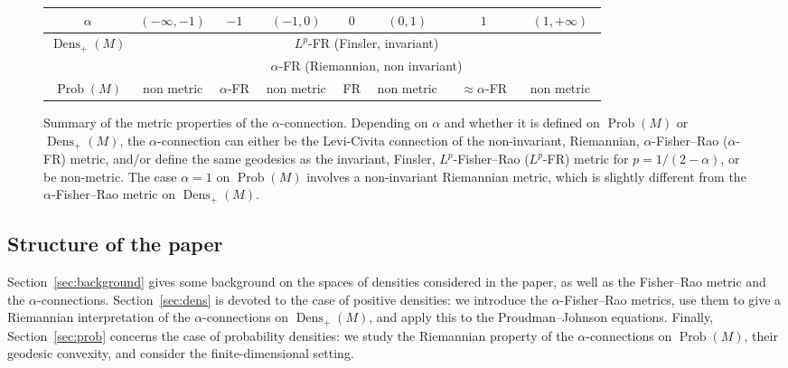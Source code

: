 \documentclass[11pt,reqno]{amsart}
\theoremstyle{definition}
\newcommand{\Prob}{\operatorname{Prob}(M)}
\newcommand{\Dens}{\operatorname{Dens}_+(M)}
\begin{document}
\begin{figure}\label{fig:summary}
\bgroup
\def\arraystretch{1.25}
\begin{tabular}{|c|c|c|c|c|c|c|c|}
  \hline
  $\alpha$                  & $(-\infty,-1)$ & $-1$ & $(-1,0)$ & $0$ & $(0,1)$ & $1$           & $(1,+\infty)$\\
  \hline
  \multirow{2}{*}{$\Dens$} & \cellcolor{gray!50} & \multicolumn{5}{c|}{$L^p$-FR (Finsler, invariant)} & \cellcolor{gray!50}\\
  \cline{2-8}
                           & \multicolumn{7}{c|}{$\alpha$-FR (Riemannian, non invariant)} \\
  \hline
  $\Prob$ & \,\,non metric\,\, & $\alpha$-FR & \,\,non metric\,\, & FR & \,\,non metric\,\, & \,\,\,$\approx \alpha$-FR\,\,\, & \,\,non metric\,\,\\
  \hline
\end{tabular}
\egroup
\caption{Summary of the metric properties of the $\alpha$-connection. Depending on $\alpha$ and whether it is defined on $\Prob$ or $\Dens$, the $\alpha$-connection can either be the Levi-Civita connection of the non-invariant, Riemannian, $\alpha$-Fisher--Rao ($\alpha$-FR) metric, and/or define the same geodesics as the invariant, Finsler, $L^p$-Fisher--Rao ($L^p$-FR) metric for $p=1/(2-\alpha)$, or be non-metric. 
The case $\alpha=1$ on $\Prob$ involves a non-invariant Riemannian metric, which is slightly different from the $\alpha$-Fisher--Rao metric on $\Dens$.} 
\end{figure}

\subsection*{Structure of the paper}
Section~\ref{sec:background} gives some background on the spaces of densities considered in the paper, as well as the Fisher--Rao metric and the $\alpha$-connections. Section~\ref{sec:dens} is devoted to the case of positive densities: we introduce the $\alpha$-Fisher--Rao metrics, use them to give a Riemannian interpretation of the $\alpha$-connections on $\Dens$,  and apply this to the Proudman--Johnson equations. Finally, Section~\ref{sec:prob} concerns the case of probability densities: we study the Riemannian property of the $\alpha$-connections on $\Prob$, their geodesic convexity, and consider the finite-dimensional setting. 
\end{document}
